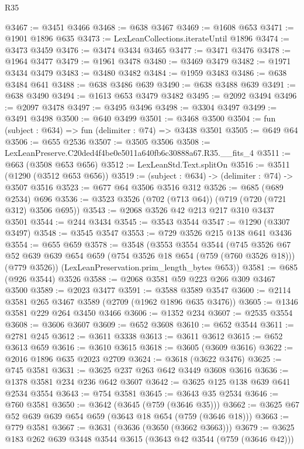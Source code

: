 \begin{lexlean}{R35}
\begin{coremodule}
@3467 := @3451 @3466
@3468 := @638 @3467
@3469 := @1608 @653
@3471 := @1901 @1896 @635
@3473 := LexLeanCollections.iterateUntil @1896
@3474 := @3473 @3459
@3476 := @3474 @3434 @3465
@3477 := @3471 @3476
@3478 := @1964 @3477
@3479 := @1961 @3478
@3480 := @3469 @3479
@3482 := @1971 @3434 @3479
@3483 := @3480 @3482
@3484 := @1959 @3483
@3486 := @638 @3484 @641
@3488 := @638 @3486 @639
@3490 := @638 @3488 @639
@3491 := @638 @3490
@3494 := @1613 @653 @3479 @3482
@3495 := @2092 @3494
@3496 := @2097 @3478
@3497 := @3495 @3496
@3498 := @3304 @3497
@3499 := @3491 @3498
@3500 := @640 @3499
@3501 := @3468 @3500
@3504 := fun (subject : @634) => fun (delimiter : @74) => @3438 @3501
@3505 := @649 @64
@3506 := @655 @2536
@3507 := @3505 @3506
@3508 := LexLeanPreserve.C20ded4f4be0e5011a640fb6c30888a67.R35.__fits_4
@3511 := @663 (@3508 @653 @656)
@3512 := LexLeanStd.Text.splitOn
@3516 := @3511 (@1290 (@3512 @653 @656))
@3519 := (subject : @634) -> (delimiter : @74) -> @3507 @3516
@3523 := @677 @64 @3506 @3516 @312
@3526 := @685 (@689 @2534) @696
@3536 := @3523 @3526 (@702 (@713 @64)) (@719 (@720 (@721 @312) @3506 @695))
@3543 := @2068 @3526 @42 @213 @217 @310 @3437 @3501
@3544 := @244 @3434
@3545 := @3543 @3544
@3547 := @1290 (@3307 @3497)
@3548 := @3545 @3547
@3553 := @729 @3526 @215 @138 @641 @3436
@3554 := @655 @659
@3578 := @3548
    (@3553
      @3554
      @3544
      (@745
        @3526
        @67
        @52
        @639
        @639
        @654
        @659
        (@754 @3526 @18 @654 (@759 (@760 @3526 @18)))
        (@779 @3526))
      (LexLeanPreservation.prim_length_bytes @653))
@3581 := @685 (@926 @3544) @3526
@3588 := @2068 @3581 @59 @223 @266 @309 @3467 @3500
@3589 := @2023 @3477
@3591 := @3588 @3589 @3547
@3600 := @2114 @3581 @265 @3467 @3589 (@2709 (@1962 @1896 @635 @3476))
@3605 := @1346 @3581 @229 @264 @3450 @3466
@3606 := @1352 @234
@3607 := @2535 @3554
@3608 := @3606 @3607
@3609 := @652 @3608
@3610 := @652 @3544
@3611 := @2781 @245
@3612 := @3611 @3338
@3613 := @3611 @3612
@3615 := @652 @3613 @659
@3616 := @3610 @3615
@3618 := @3605 (@3609 @3616)
@3622 := @2016 @1896 @635 @2023 @2709
@3624 := @3618 (@3622 @3476)
@3625 := @745 @3581
@3631 := @3625 @237 @263 @642 @3449 @3608 @3616
@3636 := @1378 @3581 @234 @236 @642 @3607
@3642 := @3625 @125 @138 @639 @641 @2534 @3554
@3643 := @754 @3581
@3645 := @3643 @35 @2534
@3646 := @760 @3581
@3650 := @3642 (@3645 (@759 (@3646 @35)))
@3662 := @3625 @67 @52 @639 @639 @654 @659 (@3643 @18 @654 (@759 (@3646 @18)))
@3663 := @779 @3581
@3667 := @3631 (@3636 (@3650 (@3662 @3663)))
@3679 := @3625 @183 @262 @639 @3448 @3544 @3615 (@3643 @42 @3544 (@759 (@3646 @42)))

\end{coremodule}
\end{lexlean}
